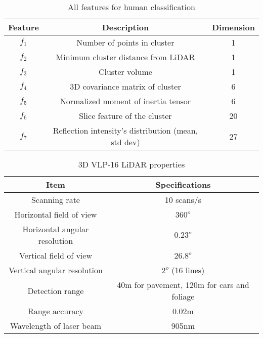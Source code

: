 \documentclass[a4paper, 12pt]{article}
\begin{document}
\begin{sloppypar}
\begin{table}[h!]
    \centering
    \begin{tabular}{||c|c|c||}
        \hline
        \rowcolor{lightgray}
        \textbf{Feature} & \textbf{Description}                                & \textbf{Dimension} \\ [0.5ex]
        \hline\hline
        $f_1$            & Number of points in cluster                         & 1                  \\
        $f_2$            & Minimum cluster distance from LiDAR                 & 1                  \\
        $f_3$            & Cluster volume                                      & 1                  \\
        $f_4$            & 3D covariance matrix of cluster                     & 6                  \\
        $f_5$            & Normalized moment of inertia tensor                 & 6                  \\
        $f_6$            & Slice feature of the cluster                        & 20                 \\
        $f_7$            & Reflection intensity's distribution (mean, std dev) & 27                 \\ [0.5ex]
        \hline
    \end{tabular}
    \caption{All features for human classification}
    \label{Chap3:Table1}
\end{table}

\begin{table}[h!]
    \centering
    \begin{tabular}{||c|c||}
        \hline
        \rowcolor{lightgray}
        \textbf{Item}                 & \textbf{Specifications}                     \\ [0.5ex]
        \hline\hline
        Scanning rate                 & 10 scans/s                                  \\ \hline
        Horizontal field of view      & $360^o$                                     \\ \hline
        Horizontal angular resolution & $0.23^o$                                    \\ \hline
        Vertical field of view        & $26.8^o$                                    \\ \hline
        Vertical angular resolution   & $2^o$ (16 lines)                            \\ \hline
        Detection range               & 40m for pavement, 120m for cars and foliage \\ \hline
        Range accuracy                & 0.02m                                       \\ \hline
        Wavelength of laser beam      & 905nm                                       \\ [0.5ex]
        \hline
    \end{tabular}
    \caption{3D VLP-16 LiDAR properties \cite{vlp16}}
    \label{Chap4:Table1}
\end{table}



\end{sloppypar}
\end{document}
